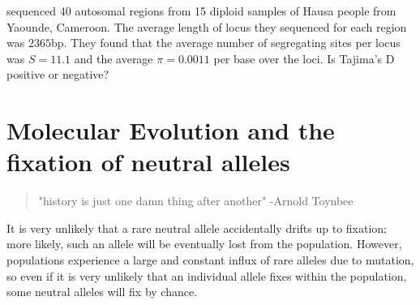 \begin{question}
\citet{voight2005interrogating} sequenced 40 autosomal regions from 15 diploid samples of Hausa people from Yaounde, Cameroon. The average length of locus they sequenced for each region was $2365$bp. They found that the average number of segregating sites per locus was $S= 11.1$ and the average $\pi = 0.0011$ per base over the loci. Is Tajima's D positive or negative? 
\end{question}








\section{Molecular Evolution and the fixation of neutral alleles} 
\begin{quote}
"history is just one damn thing after another" -Arnold Toynbee 
\end{quote} %

It is very unlikely that a rare
neutral allele accidentally drifts up to fixation; more likely, such an allele
will be eventually lost from the population. However, populations experience a
large and constant influx of rare alleles due to mutation, so even if it is
very unlikely that an individual allele fixes within the population, some
neutral alleles will fix by chance. \\




